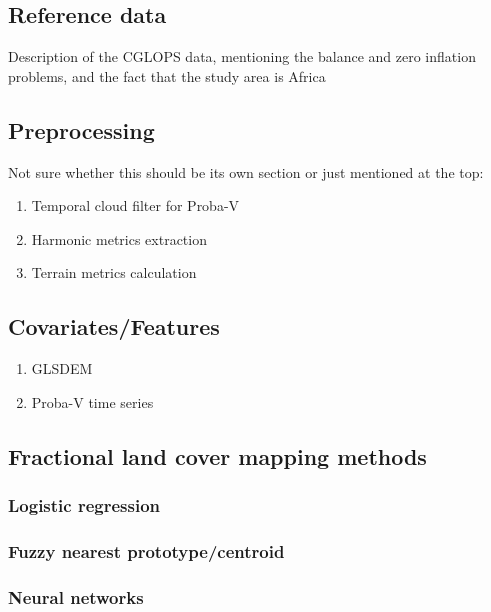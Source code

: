 \documentclass[a4paper,10pt]{article}
\begin{document}
\subsection{Reference data}

Description of the CGLOPS data, mentioning the balance and zero inflation problems, and the fact that the study area is Africa

\subsection{Preprocessing}

Not sure whether this should be its own section or just mentioned at the top:

\begin{enumerate}
 \item Temporal cloud filter for Proba-V
 \item Harmonic metrics extraction
 \item Terrain metrics calculation
\end{enumerate}

\subsection{Covariates/Features}

\begin{enumerate}
 \item GLSDEM
 \item Proba-V time series
\end{enumerate}

\subsection{Fractional land cover mapping methods}

\subsubsection{Logistic regression}

\subsubsection{Fuzzy nearest prototype/centroid}

\subsubsection{Neural networks}
\end{document}
